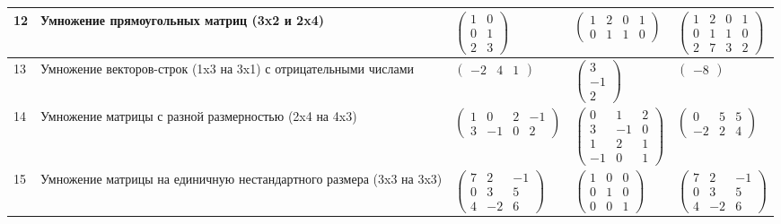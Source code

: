 \begin{table}[H]
\begin{center}
{\begin{tabular}{|x{1cm}|x{6cm}|x{3.5cm}|x{2.5cm}|x{4cm}|}
				12
				& Умножение прямоугольных матриц (3x2 и 2x4)
				& $\begin{pmatrix}
					1 & 0\\
					0 & 1\\
					2 & 3
				\end{pmatrix}$
				& $\begin{pmatrix}
					1 & 2 & 0 & 1\\
					0 & 1 & 1 & 0
				\end{pmatrix}$
				& $\begin{pmatrix}
					1 & 2 & 0 & 1\\
					0 & 1 & 1 & 0\\
					2 & 7 & 3 & 2
				\end{pmatrix}$
				\\ \hline
				
				13
				& Умножение векторов-строк (1x3 на 3x1) с отрицательными числами
				& $\begin{pmatrix} -2 & 4 & 1 \end{pmatrix}$
				& $\begin{pmatrix} 3 \\ -1 \\ 2 \end{pmatrix}$
				& $\begin{pmatrix} -8 \end{pmatrix}$ \\ \hline
				
				14
				& Умножение матрицы с разной размерностью (2x4 на 4x3)
				& $\begin{pmatrix} 1 & 0 & 2 & -1\\ 3 & -1 & 0 & 2 \end{pmatrix}$
				& $\begin{pmatrix} 0 & 1 & 2\\ 3 & -1 & 0\\ 1 & 2 & 1\\ -1 & 0 & 1 \end{pmatrix}$
				& $\begin{pmatrix} 0 & 5 & 5\\ -2 & 2 & 4 \end{pmatrix}$ \\ \hline
				
				15
				& Умножение матрицы на единичную нестандартного размера (3x3 на 3x3)
				& $\begin{pmatrix} 7 & 2 & -1\\ 0 & 3 & 5\\ 4 & -2 & 6 \end{pmatrix}$
				& $\begin{pmatrix} 1 & 0 & 0\\ 0 & 1 & 0\\ 0 & 0 & 1 \end{pmatrix}$
				& $\begin{pmatrix} 7 & 2 & -1\\ 0 & 3 & 5\\ 4 & -2 & 6 \end{pmatrix}$ \\ \hline
				

\end{tabular}}
\end{center}
\end{table}
